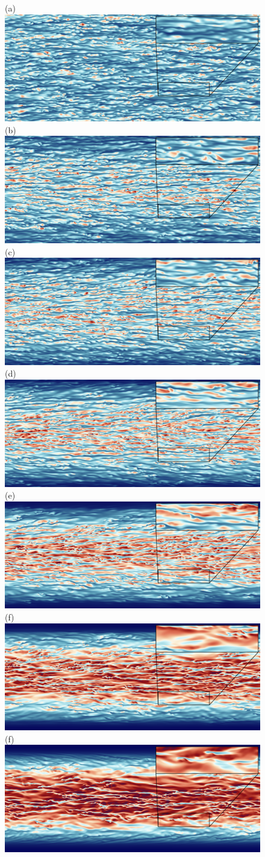 \documentclass[lineno]{jfm}
\begin{document}
	\begin{figure}
		\centering
                (a) \includegraphics[width=6.cm]{Figures/unrolled_rotz0_roty0_T.png}
                (b) \includegraphics[width=6.cm]{Figures/unrolled_rotz0_roty0.00390625_T.png} \\
                (c) \includegraphics[width=6.cm]{Figures/unrolled_rotz0_roty0.0078125_T.png} 
                (d) \includegraphics[width=6.cm]{Figures/unrolled_rotz0_roty0.015625_T.png} \\
                (e) \includegraphics[width=6.cm]{Figures/unrolled_rotz0_roty0.03125_T.png} 
                (f) \includegraphics[width=6.cm]{Figures/unrolled_rotz0_roty0.0625_T.png} \\
                (f) \includegraphics[width=6.cm]{Figures/unrolled_rotz0_roty0.125_T.png} 

\end{figure}
\end{document}
